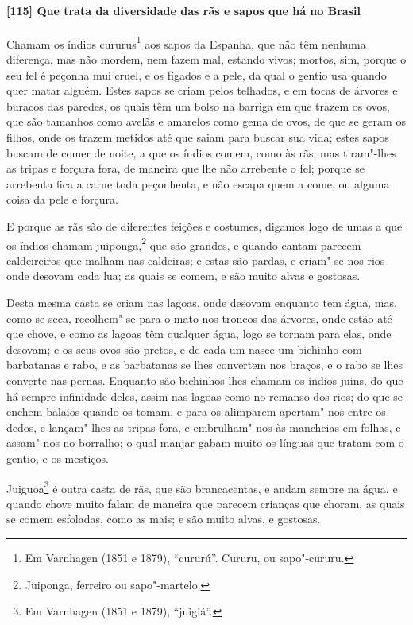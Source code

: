 \begin{linenumbers}
\paragraph{[115] Que trata da diversidade das rãs e sapos que há no Brasil}\quad
Chamam os índios cururus\footnote{ Em Varnhagen (1851 e 1879), ``cururú''. Cururu, ou
sapo"-cururu.} aos sapos da Espanha, que não têm nenhuma diferença, mas não mordem, nem
fazem mal, estando vivos; mortos, sim, porque o seu fel é peçonha mui cruel, e os fígados
e a pele, da qual o gentio usa quando quer matar alguém. Estes sapos se criam pelos
telhados, e em tocas de árvores e buracos das paredes, os quais têm um bolso na barriga em
que trazem os ovos, que são tamanhos como avelãs e amarelos como gema de ovos, de que se
geram os filhos, onde os trazem metidos até que saiam para buscar sua vida; estes sapos
buscam de comer de noite, a que os índios comem, como às rãs; mas tiram"-lhes as tripas e
forçura fora, de maneira que lhe não arrebente o fel; porque se arrebenta fica a carne
toda peçonhenta, e não escapa quem a come, ou alguma coisa da pele e forçura.

E porque as rãs são de diferentes feições e costumes, digamos logo de umas a que os índios
chamam juiponga,\footnote{ Juiponga, ferreiro ou sapo"-martelo.} que são grandes, e quando
cantam parecem caldeireiros que malham nas caldeiras; e estas são pardas, e criam"-se nos
rios onde desovam cada lua; as quais se comem, e são muito alvas e gostosas.

Desta mesma casta se criam nas lagoas, onde desovam enquanto tem água, mas, como se seca,
recolhem"-se para o mato nos troncos das árvores, onde estão até que chove, e como as
lagoas têm qualquer água, logo se tornam para elas, onde desovam; e os seus ovos são
pretos, e de cada um nasce um bichinho com barbatanas e rabo, e as barbatanas se lhes
convertem nos braços, e o rabo se lhes converte nas pernas. Enquanto são bichinhos lhes
chamam os índios juins, do que há sempre infinidade deles, assim nas lagoas como no
remanso dos rios; do que se enchem balaios quando os tomam, e para os alimparem
apertam"-nos entre os dedos, e lançam"-lhes as tripas fora, e embrulham"-nos às mancheias em
folhas, e assam"-nos no borralho; o qual manjar gabam muito os línguas que tratam com o
gentio, e os mestiços.

Juiguoa\footnote{ Em Varnhagen (1851 e 1879), ``juigiá''.} é outra casta de rãs, que são
brancacentas, e andam sempre na água, e quando chove muito falam de maneira que parecem
crianças que choram, as quais se comem esfoladas, como as mais; e são muito alvas, e
gostosas.


\end{linenumbers}
